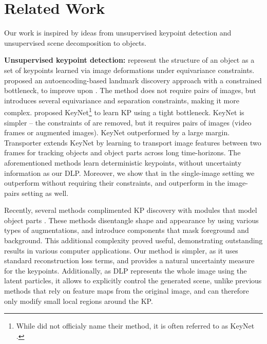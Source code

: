 \documentclass[nohyperref]{article}
\theoremstyle{plain}
\theoremstyle{definition}
\theoremstyle{remark}
\begin{document}
\section{Related Work}
\label{sec:rel_work}
Our work is inspired by ideas from unsupervised keypoint detection and unsupervised scene decomposition to objects.

\textbf{Unsupervised keypoint detection:} \citet{thewlis2017unsupervised1} represent the structure of an object as a set of keypoints learned via image deformations under equivariance constraints. 
\citet{zhang2018kp} proposed an autoencoding-based landmark discovery approach with a constrained bottleneck, to improve upon \citet{thewlis2017unsupervised1}. The method does not require pairs of images, but introduces several equivariance and separation constraints, making it more complex. \citet{jakab2018unsupervised} proposed KeyNet\footnote{While \citet{jakab2018unsupervised} did not officialy name their method, it is often referred to as KeyNet \citep[e.g.,][]{gopalakrishnan2020permakey}.} to learn KP using a tight bottleneck. KeyNet is simpler -- the constraints of \citet{zhang2018kp} are removed, but it requires pairs of images (video frames or augmented images). KeyNet outperformed \citet{zhang2018kp} by a large margin.
Transporter \citep{kulkarni2019transporter} extends KeyNet by learning to transport image features between two frames for tracking objects and object parts across long time-horizons.
The aforementioned methods learn deterministic keypoints, without uncertainty information as our DLP. Moreover, we show that in the single-image setting we outperform \citet{zhang2018kp} without requiring their constraints, and outperform \citet{jakab2018unsupervised} in the image-pairs setting as well.

Recently, several methods  complimented KP discovery with modules that model object parts \citep{lorenz2019unsupervised, dundar2021unsupervised}. These methods disentangle shape and appearance by using various types of augmentations, and introduce components that mask foreground and background. 
This additional complexity proved useful, demonstrating outstanding results in various computer applications. Our method is simpler, as it uses standard reconstruction loss terms, and provides a natural uncertainty measure for the keypoints. Additionally, as DLP represents the whole image using the latent particles, it allows to explicitly control the generated scene, unlike previous methods that rely on feature maps from the original image, and can therefore only modify small local regions around the KP.
\end{document}
